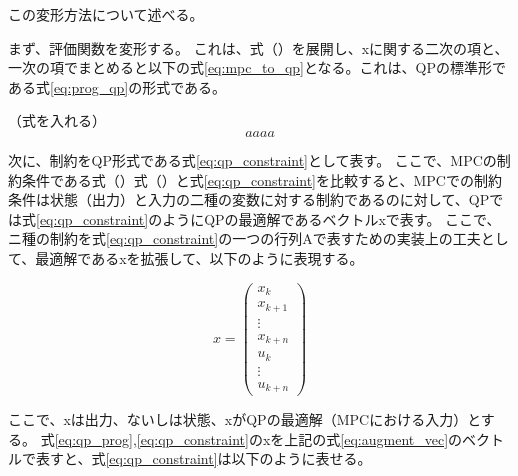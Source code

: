 この変形方法について述べる。

まず、評価関数を変形する。
これは、式（）を展開し、xに関する二次の項と、一次の項でまとめると以下の式\eqref{eq:mpc_to_qp}となる。これは、QPの標準形である式\eqref{eq:prog_qp}の形式である。

（式を入れる）
\begin{equation}
  aaaa
  \label{eq:mpc_to_qp}
\end{equation}

次に、制約をQP形式である式\eqref{eq:qp_constraint}として表す。
ここで、MPCの制約条件である式（）式（）と式\eqref{eq:qp_constraint}を比較すると、MPCでの制約条件は状態（出力）と入力の二種の変数に対する制約であるのに対して、QPでは式\eqref{eq:qp_constraint}のようにQPの最適解であるベクトルxで表す。
ここで、ニ種の制約を式\eqref{eq:qp_constraint}の一つの行列Aで表すための実装上の工夫として、最適解であるxを拡張して、以下のように表現する。

\begin{equation}
  x =
  \begin{pmatrix}
    x_{k} \\ x_{k+1} \\ \vdots \\ x_{k+n}
    \\
    u_{k} \\ \vdots \\ u_{k+n}
  \end{pmatrix}
  \label{eq:augment_vec}
\end{equation}

ここで、xは出力、ないしは状態、xがQPの最適解（MPCにおける入力）とする。
式\eqref{eq:qp_prog},\eqref{eq:qp_constraint}のxを上記の式\eqref{eq:augment_vec}のベクトルで表すと、式\eqref{eq:qp_constraint}は以下のように表せる。

